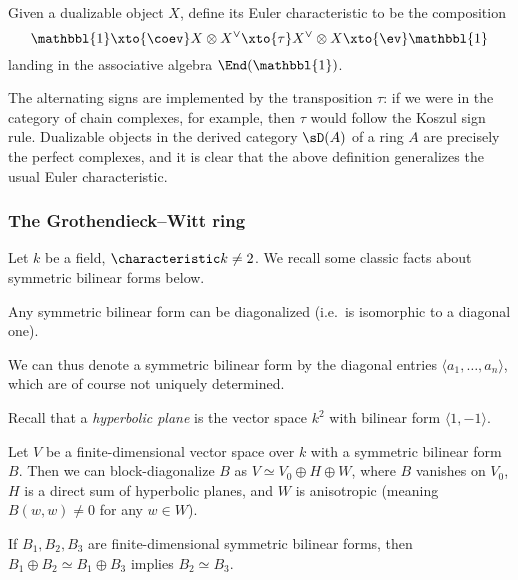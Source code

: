 \begin{definition}

Given a dualizable object $X$, define its Euler characteristic to be the composition
\[\mathbbl{1} \xto{\coev} X\otimes X^\vee \xto{\tau} X^\vee\otimes X \xto{\ev} \mathbbl{1}\]
landing in the associative algebra $\End(\mathbbl{1})$. 
\end{definition}

The alternating signs are implemented by the transposition $\tau$: if we were in the category of chain complexes, for example, then $\tau$ would follow the Koszul sign rule. Dualizable objects in the derived category $\sD(A)$ of a ring $A$ are precisely the perfect complexes, and it is clear that the above definition generalizes the usual Euler characteristic.


\subsubsection{The Grothendieck--Witt ring}

Let $k$ be a field, $\characteristic k \neq 2$. We recall some classic facts about symmetric bilinear forms below.


\begin{theorem}
Any symmetric bilinear form can be diagonalized (i.e.~is isomorphic to a diagonal one).	
\end{theorem}

We can thus denote a symmetric bilinear form by the diagonal entries $\langle a_1,\dots,a_n\rangle$, which are of course not uniquely determined. 

Recall that a \emph{hyperbolic plane} is the vector space $k^2$ with bilinear form $\langle 1, -1\rangle$.

\begin{theorem}
Let $V$ be a finite-dimensional vector space over $k$ with a symmetric bilinear form $B$. Then we can block-diagonalize $B$ as $V\simeq V_0 \oplus H\oplus W$, where $B$ vanishes on $V_0$, $H$ is a direct sum of hyperbolic planes, and $W$ is anisotropic (meaning $B(w,w)\neq 0$ for any $w\in W$).
\end{theorem}

\begin{theorem}
\label{theorem:Witt-cancel}
If $B_1,B_2,B_3$ are finite-dimensional symmetric bilinear forms, then $B_1\oplus B_2\simeq B_1\oplus B_3$ implies $B_2\simeq B_3$.
\end{theorem}


